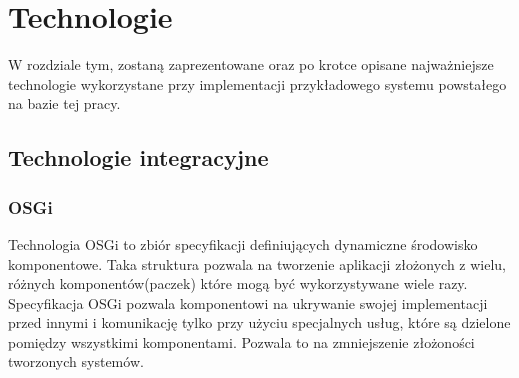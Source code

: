 \ifpdf
    \graphicspath{{3/figures/PNG/}{3/figures/PDF/}{3/figures/}}
\else
    \graphicspath{{3/figures/EPS/}{3/figures/}}
\fi
\chapter{Technologie} %


W rozdziale tym, zostaną zaprezentowane oraz po krotce opisane najważniejsze technologie wykorzystane przy implementacji przykładowego systemu  powstałego na bazie tej pracy.

\section{Technologie integracyjne}
\subsection{OSGi}
Technologia OSGi to zbiór specyfikacji definiujących dynamiczne środowisko komponentowe. Taka struktura pozwala na tworzenie aplikacji złożonych z wielu, różnych komponentów(paczek) które mogą być wykorzystywane wiele razy. Specyfikacja OSGi pozwala komponentowi na ukrywanie swojej implementacji przed innymi i komunikację tylko przy użyciu specjalnych usług, które są dzielone pomiędzy wszystkimi komponentami. Pozwala to na zmniejszenie złożoności tworzonych systemów.

